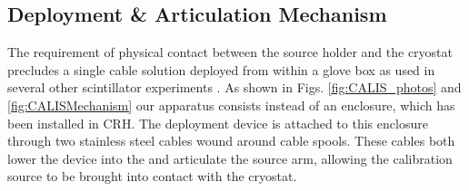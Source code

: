 \subsection{Deployment \& Articulation Mechanism}\label{sec:DeploymentArticulation}
The requirement of physical contact between the source holder and the cryostat precludes a single cable solution deployed from within a glove box as used in several other scintillator experiments \cite{Banks:2014hra, Huang:2013uxa}. %
As shown in Figs. \ref{fig:CALIS_photos} and \ref{fig:CALISMechanism} our apparatus consists instead of an enclosure, which has been installed in CRH. The deployment device is attached to this enclosure through two stainless steel cables wound around cable spools. These cables both lower the device into the \lsv and articulate the source arm, allowing the calibration source to be brought into contact with the cryostat.
